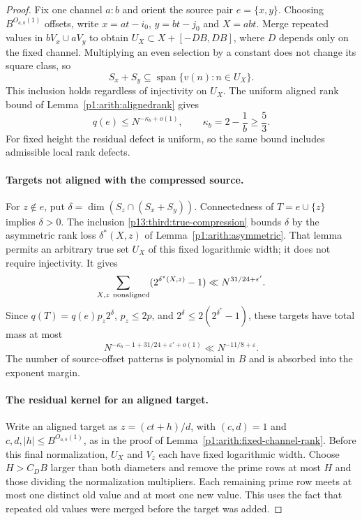 \begin{proof}
Fix one channel $a:b$ and orient the source pair $e=\{x,y\}$.
Choosing $B^{O_{a,b}(1)}$ offsets, write
$x=at-i_0$, $y=bt-j_0$ and $X=abt$.
Merge repeated values in $bV_x\cup aV_y$ to obtain
$U_X\subset X+[-D B,D B]$, where $D$ depends only on the fixed channel.
Multiplying an even selection by a constant does not change its square
class, so
\begin{equation}
 S_x+S_y\subseteq
       \operatorname{span}\{v(n):n\in U_X\}.
 \label{p13:third:true-compression}
\end{equation}
This inclusion holds regardless of injectivity on $U_X$.
The uniform aligned rank bound of
Lemma~\ref{p1:arith:alignedrank} gives
\begin{equation}
 q(e)\leq N^{-\kappa_b+o(1)},\qquad
                   \kappa_b=2-\frac1b\geq\frac53.
 \label{p13:third:source-weight}
\end{equation}
For fixed height the residual defect is uniform, so the same bound
includes admissible local rank defects.

\paragraph{Targets not aligned with the compressed source.}
For $z\notin e$, put
$\delta=\dim(S_z\cap(S_x+S_y))$.
Connectedness of $T=e\cup\{z\}$ implies $\delta>0$.
The inclusion \eqref{p13:third:true-compression} bounds $\delta$ by
the asymmetric rank loss $\delta^*(X,z)$ of
Lemma~\ref{p1:arith:asymmetric}.  That lemma permits an arbitrary true
set $U_X$ of this fixed logarithmic width; it does not require injectivity.
It gives
\[
 \sum_{X,z\ {\rm nonaligned}}(2^{\delta^*(X,z)}-1)
                         \ll N^{31/24+\varepsilon'}.
\]
Since $q(T)=q(e)p_z2^\delta$, $p_z\leq2p$, and
$2^\delta\leq2(2^{\delta^*}-1)$, these targets have total mass at most
\begin{equation}
 N^{-\kappa_b-1+31/24+\varepsilon'+o(1)}
                     \ll N^{-11/8+\varepsilon}.
 \label{p13:third:unaligned-target-cost}
\end{equation}
The number of source-offset patterns is polynomial in $B$ and is
absorbed into the exponent margin.

\paragraph{The residual kernel for an aligned target.}
Write an aligned target as
$z=(ct+h)/d$, with $(c,d)=1$ and
$c,d,|h|\leq B^{O_{a,b}(1)}$, as in the proof of
Lemma~\ref{p1:arith:fixed-channel-rank}.
Before this final normalization, $U_X$ and $V_z$ each have fixed
logarithmic width.  Choose $H>C_D B$ larger than both diameters and
remove the prime rows at most $H$ and those dividing the normalization
multipliers.  Each remaining prime row meets at most one distinct old
value and at most one new value.  This uses the fact that repeated
old values were merged before the target was added.


\end{proof}
